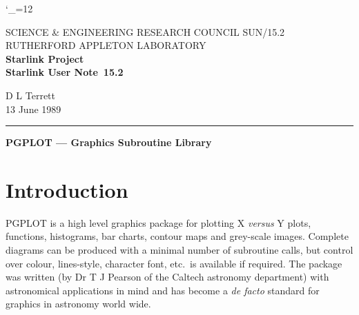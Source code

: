 \pagestyle{myheadings}

\newcommand{\stardoccategory}  {Starlink User Note}
\newcommand{\stardocinitials}  {SUN}
\newcommand{\stardocnumber}    {15.2}
\newcommand{\stardocauthors}   {D L Terrett}
\newcommand{\stardocdate}      {13 June 1989}
\newcommand{\stardoctitle}     {PGPLOT --- Graphics Subroutine Library}

\newcommand{\stardocname}{\stardocinitials /\stardocnumber}
\markright{\stardocname}
\setlength{\textwidth}{160mm}
\setlength{\textheight}{240mm}
\setlength{\topmargin}{-5mm}
\setlength{\oddsidemargin}{0mm}
\setlength{\evensidemargin}{0mm}
\setlength{\parindent}{0mm}
\setlength{\parskip}{\medskipamount}
\setlength{\unitlength}{1mm}

\catcode`\_=12


\thispagestyle{empty}
SCIENCE \& ENGINEERING RESEARCH COUNCIL \hfill \stardocname\\
RUTHERFORD APPLETON LABORATORY\\
{\large\bf Starlink Project\\}
{\large\bf \stardoccategory\ \stardocnumber}
\begin{flushright}
\stardocauthors\\
\stardocdate
\end{flushright}
\vspace{-4mm}
\rule{\textwidth}{0.5mm}
\vspace{5mm}
\begin{center}
{\Large\bf \stardoctitle}
\end{center}
\vspace{5mm}

\section{Introduction}

PGPLOT is a high level graphics package for plotting X {\em versus} Y plots,
functions, histograms, bar charts, contour maps and grey-scale images. Complete
diagrams can be produced with a minimal number of subroutine calls, but control
over colour, lines-style, character font, etc.\ is available if required. The
package was written (by Dr T J Pearson of the Caltech astronomy department)
with astronomical applications in mind and has become a {\it de facto} standard
for graphics in astronomy world wide.

